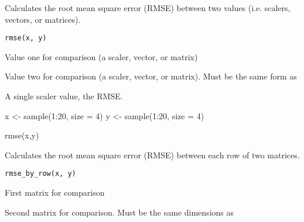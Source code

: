 \documentclass[a4paper]{book}
\begin{document}
%
\begin{Value}
\end{Value}
%
\begin{Description}\relax
Calculates the root mean square error (RMSE) between two values (i.e. scalers, 
vectors, or matrices).
\end{Description}
%
\begin{Usage}
\begin{verbatim}
rmse(x, y)
\end{verbatim}
\end{Usage}
%
\begin{Arguments}
\begin{ldescription}
\item[\code{x}] Value one for comparison (a scaler, vector, or matrix)

\item[\code{y}] Value two for comparison (a scaler, vector, or matrix). Must be the 
same form as 
\end{ldescription}
\end{Arguments}
%
\begin{Value}
A single scaler value, the RMSE.
\end{Value}
%
\begin{Examples}
\begin{ExampleCode}
x <- sample(1:20, size = 4)
y <- sample(1:20, size = 4)

rmse(x,y)

\end{ExampleCode}
\end{Examples}
%
\begin{Description}\relax
Calculates the root mean square error (RMSE) between each row of two matrices.
\end{Description}
%
\begin{Usage}
\begin{verbatim}
rmse_by_row(x, y)
\end{verbatim}
\end{Usage}
%
\begin{Arguments}
\begin{ldescription}
\item[\code{x}] First matrix for comparison

\item[\code{y}] Second matrix for comparison. Must be the same dimensions as 
\end{ldescription}
\end{Arguments}
\end{document}
